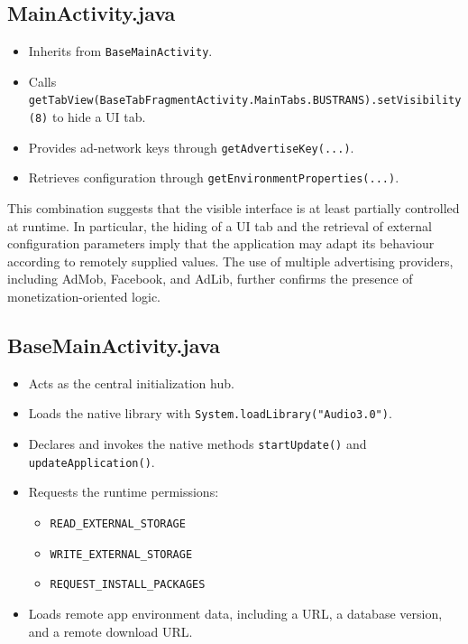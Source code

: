 \subsection{MainActivity.java}
\begin{itemize}
    \item Inherits from \texttt{BaseMainActivity}.
    \item Calls \texttt{getTabView(BaseTabFragmentActivity.MainTabs.BUSTRANS).setVisibility(8)} to hide a UI tab.
    \item Provides ad-network keys through \texttt{getAdvertiseKey(...)}.
    \item Retrieves configuration through \texttt{getEnvironmentProperties(...)}.
\end{itemize}

This combination suggests that the visible interface is at least partially controlled at runtime. In particular, the hiding of a UI tab and the retrieval of external configuration parameters imply that the application may adapt its behaviour according to remotely supplied values.
The use of multiple advertising providers, including AdMob, Facebook, and AdLib, further confirms the presence of monetization-oriented logic.

\subsection{BaseMainActivity.java}
\begin{itemize}
    \item Acts as the central initialization hub.
    \item Loads the native library with \texttt{System.loadLibrary("Audio3.0")}.
    \item Declares and invokes the native methods \texttt{startUpdate()} and \texttt{updateApplication()}.
    \item Requests the runtime permissions:
    \begin{itemize}
        \item \texttt{READ\_EXTERNAL\_STORAGE}
        \item \texttt{WRITE\_EXTERNAL\_STORAGE}
        \item \texttt{REQUEST\_INSTALL\_PACKAGES}
    \end{itemize}
    \item Loads remote app environment data, including a URL, a database version, and a remote download URL.
\end{itemize}

